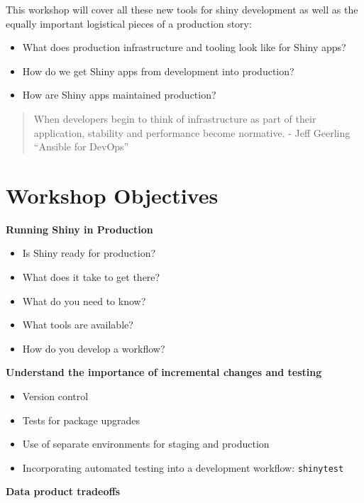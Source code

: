 \documentclass[]{book}
\providecommand{\tightlist}{%
  \setlength{\itemsep}{0pt}\setlength{\parskip}{0pt}}
\theoremstyle{definition}
\theoremstyle{definition}
\theoremstyle{definition}
\theoremstyle{remark}
\begin{document}
This workshop will cover all these new tools for shiny development as
well as the equally important logistical pieces of a production story:

\begin{itemize}
\tightlist
\item
  What does production infrastructure and tooling look like for Shiny
  apps?
\item
  How do we get Shiny apps from development into production?
\item
  How are Shiny apps maintained production?
\end{itemize}

\begin{quote}
When developers begin to think of infrastructure as part of their
application, stability and performance become normative. - Jeff Geerling
``Ansible for DevOps''
\end{quote}

\hypertarget{workshop-objectives}{%
\section{Workshop Objectives}\label{workshop-objectives}}

\textbf{Running Shiny in Production}

\begin{itemize}
\tightlist
\item
  Is Shiny ready for production?
\item
  What does it take to get there?
\item
  What do you need to know?
\item
  What tools are available?
\item
  How do you develop a workflow?
\end{itemize}

\textbf{Understand the importance of incremental changes and testing}

\begin{itemize}
\tightlist
\item
  Version control
\item
  Tests for package upgrades
\item
  Use of separate environments for staging and production
\item
  Incorporating automated testing into a development workflow:
  \texttt{shinytest}
\end{itemize}

\textbf{Data product tradeoffs}
\end{document}

